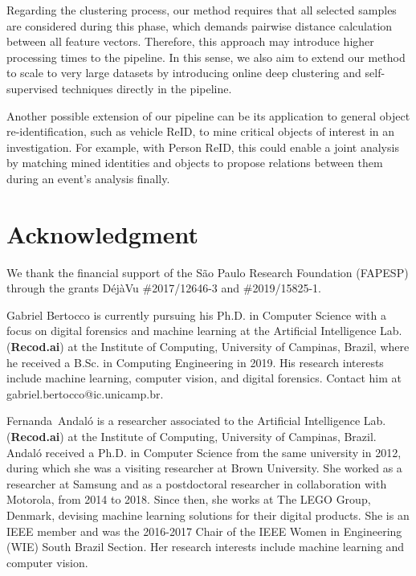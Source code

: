 \documentclass[journal]{IEEEtran}
\begin{document}
Regarding the clustering process, our method requires that all selected samples are considered during this phase, which demands pairwise distance calculation between all feature vectors. Therefore, this approach may introduce higher processing times to the pipeline. In this sense, we also aim to extend our method to scale to very large datasets by introducing online deep clustering and self-supervised techniques directly in the pipeline. 

Another possible extension of our pipeline can be its application to general object re-identification, such as vehicle ReID, to mine critical objects of interest in an investigation. For example, with Person ReID, this could enable a joint analysis by matching mined identities and objects to propose relations between them during an event's analysis finally.


\section*{Acknowledgment}
We thank the financial support of the São Paulo Research Foundation (FAPESP) through the grants D\'ej\`aVu \#2017/12646-3 and \#2019/15825-1.

\ifCLASSOPTIONcaptionsoff
  \newpage
\fi

















\begin{IEEEbiography}
{Gabriel Bertocco} is currently pursuing his Ph.D. in Computer Science with a focus on digital forensics and machine learning at the Artificial Intelligence Lab. (\textbf{Recod.ai}) at the Institute of Computing, University of Campinas, Brazil, where he received a B.Sc.
in Computing Engineering in 2019. His research interests include machine learning, computer vision, and digital forensics. Contact him at gabriel.bertocco@ic.unicamp.br.
\end{IEEEbiography}

\begin{IEEEbiography}
{Fernanda~Andal\'{o}}
is a researcher associated to the Artificial Intelligence Lab. (\textbf{Recod.ai}) at the Institute of Computing, University of Campinas, Brazil. Andal\'{o} received a Ph.D. in Computer Science from the same university in 2012, during which she was a visiting researcher at Brown University. She worked as a researcher at Samsung and as a postdoctoral researcher in collaboration with Motorola, from 2014 to 2018. Since then, she works at The LEGO Group, Denmark, devising machine learning solutions for their digital products. She is an IEEE member and was the 2016-2017 Chair of the IEEE Women in Engineering (WIE) South Brazil Section. Her research interests include machine learning and computer vision.
\end{IEEEbiography}
\end{document}

